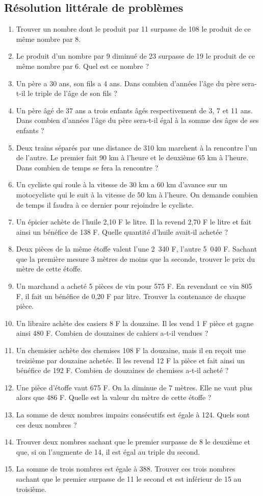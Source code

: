 \documentclass[12 pt]{extarticle}
\theoremstyle{plain}
\begin{document}
 \subsection{Résolution littérale de problèmes}
 \begin{enumerate}
 \item Trouver un nombre dont le produit par 11 surpasse de 108 le produit de 
 ce même nombre par 8. 
 \item Le produit d'un nombre par 9 diminué de 23 surpasse de 19 le produit de ce même nombre par 6. Quel est ce nombre ? 
 \item Un père a 30 ans, son fils a 4 ans. Dans combien d'années l'âge du père sera-t-il le triple de l'âge de son fils ?
 \item Un père âgé de 37 ans a trois enfants âgés respectivement de 3, 7 et 11 ans. Dans combien d'années l'âge du père sera-t-il égal à la somme des âges de ses enfants ? 
 \item Deux trains séparés par une distance de 310 km marchent à la rencontre l'un de l'autre. Le premier fait 90 km à l'heure et le deuxième 65 km à l'heure. Dans combien de temps se fera la rencontre ? 
 \item Un cycliste qui roule à la vitesse de 30 km a 60 km d'avance sur un motocycliste qui le suit à la vitesse de 50 km à l'heure. On demande combien de temps il faudra à ce dernier pour rejoindre le cycliste. 
 \item Un épicier achète de l'huile 2,10 F le litre. Il la revend 2,70 F le litre et fait ainsi un bénéfice de 138 F. Quelle quantité d'huile avait-il achetée ? 
 \item Deux pièces de la même étoffe valent l'une 2~340 F, l'autre 5~040 F. Sachant que la première mesure 3 mètres de moins que la seconde, trouver le
 prix du mètre de cette étoffe.
 \item Un marchand a acheté 5 pièces de vin pour 575 F. En revendant ce 
 vin 805 F, il fait un bénéfice de 0,20 F par litre. Trouver la contenance de chaque pièce. 
 \item Un libraire achète des casiers 8 F la douzaine. Il les vend 1 F pièce et gagne ainsi 480 F. Combien de douzaines de cahiers a-t-il vendues ? 
 \item Un chemisier achète des chemises 108 F la douzaine, mais il en 
 reçoit une treizième par douzaine achetée. Il les revend 12 F la pièce et
 fait ainsi un bénéfice de 192 F. Combien de douzaines de chemises a-t-il acheté ?
 \item Une pièce d'étoffe vaut 675 F. On la diminue de 7 mètres. Elle ne vaut plus alors que 486 F. Quelle est la valeur du mètre de cette étoffe ?
 \item La somme de deux nombres impairs consécutifs est égale à 124. Quels sont ces deux nombres ? 
 \item Trouver deux nombres sachant que le premier surpasse de 8 le deuxième et que, si on l'augmente de 14, il est égal au triple du second. 
 \item La somme de trois nombres est égale à 388. Trouver ces trois nombres
 sachant que le premier surpasse de 11 le second et est inférieur de 15 
 au troisième. 
 \end{enumerate}
 
\end{document}

